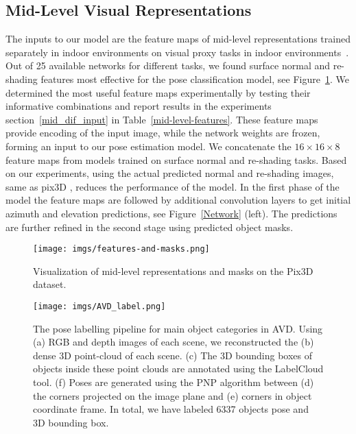 \documentclass[letterpaper, 10 pt, conference]{ieeeconf}  \pdfoutput=1
\begin{document}
\subsection{Mid-Level Visual Representations}
\label{input}
The inputs to our model are the feature maps of mid-level representations trained separately
in indoor environments on visual proxy tasks in indoor environments~\cite{taskonomy2018}. Out of 25 available networks for different tasks, we found surface normal and re-shading features most effective for the pose classification model, see Figure~\ref{inputmodel}. We determined the most useful feature maps experimentally by testing their informative combinations and report results in the experiments section~\ref{mid_dif_input} in Table~\ref{mid-level-features}.  
These feature maps provide encoding of the input image, while the network weights are frozen, forming an input to our pose estimation model. We concatenate the $16 \times 16 \times 8$ feature maps from models trained on surface normal and re-shading tasks. Based on our experiments, using the actual predicted normal and re-shading images, same as pix3D \cite{pix3d}, reduces the performance of the model.
In the first phase of the model the feature maps are followed by additional convolution layers
to get initial azimuth and elevation predictions, see Figure~\ref{Network} (left). The predictions are further refined in the second stage using predicted object masks.












\begin{figure}[htbp]
\begin{center}


  \texttt{[image: imgs/features-and-masks.png]}
\end{center}
   \caption{Visualization of mid-level representations and masks on the Pix3D dataset.}
\label{inputmodel}
\end{figure}
\begin{figure*}[htbp]
\begin{center}
\texttt{[image: imgs/AVD\_label.png]}
\end{center}
   \caption{The pose labelling pipeline for main object categories in AVD. Using (a) RGB and depth images of each scene, we reconstructed the (b) dense 3D point-cloud of each scene. (c) The 3D bounding boxes of objects inside these point clouds are annotated using the LabelCloud tool. (f) Poses are generated using the PNP algorithm between (d) the corners projected on the image plane and (e) corners in object coordinate frame. In total, we have labeled 6337 objects pose and 3D bounding box.}
\label{AVD_labeling_pipline}
\end{figure*} 
\end{document}
